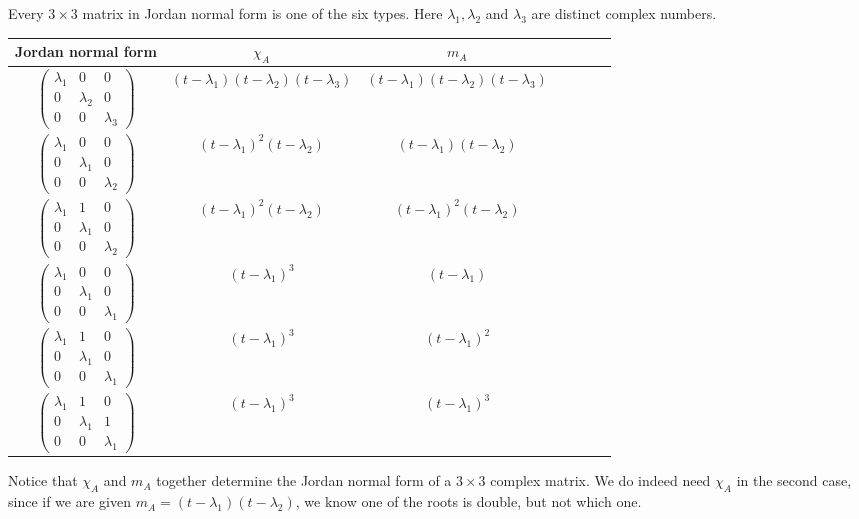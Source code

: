 \documentclass[a4paper]{article}
\begin{document}
\begin{example}
	Every $3\times 3$ matrix in Jordan normal form is one of the six types. Here $\lambda_1, \lambda_2$ and $\lambda_3$ are distinct complex numbers.
  \begin{center}
    \begin{tabular}{ccccccc}
      \toprule
      Jordan normal form & $\chi_A$ & $m_A$\\
      \midrule
      $\begin{pmatrix} \lambda_1 & 0 & 0\\ 0 & \lambda_2 & 0\\ 0 & 0 & \lambda_3 \end{pmatrix}$ & $(t - \lambda_1)(t - \lambda_2)(t- \lambda_3)$ & $(t - \lambda_1)(t - \lambda_2)(t- \lambda_3)$\\\addlinespace
      $\begin{pmatrix} \lambda_1 & 0 & 0\\ 0 & \lambda_1 & 0\\ 0 & 0 & \lambda_2 \end{pmatrix}$ & $(t - \lambda_1)^2 (t - \lambda_2)$ & $(t - \lambda_1) (t - \lambda_2)$\\\addlinespace
      $\begin{pmatrix} \lambda_1 & 1 & 0\\ 0 & \lambda_1 & 0\\ 0 & 0 & \lambda_2 \end{pmatrix}$ & $(t - \lambda_1)^2 (t - \lambda_2)$ & $(t - \lambda_1)^2 (t - \lambda_2)$\\\addlinespace
      $\begin{pmatrix} \lambda_1 & 0 & 0\\ 0 & \lambda_1 & 0\\ 0 & 0 & \lambda_1 \end{pmatrix}$ & $(t - \lambda_1)^3$ & $(t - \lambda_1)$\\\addlinespace
      $\begin{pmatrix} \lambda_1 & 1 & 0\\ 0 & \lambda_1 & 0\\ 0 & 0 & \lambda_1 \end{pmatrix}$ & $(t - \lambda_1)^3$ & $(t - \lambda_1)^2$\\\addlinespace
      $\begin{pmatrix} \lambda_1 & 1 & 0\\ 0 & \lambda_1 & 1\\ 0 & 0 & \lambda_1 \end{pmatrix}$ & $(t - \lambda_1)^3$ & $(t - \lambda_1)^3$\\
      \bottomrule
    \end{tabular}
  \end{center}
  Notice that $\chi_A$ and $m_A$ together determine the Jordan normal form of a $3\times 3$ complex matrix. We do indeed need $\chi_A$ in the second case, since if we are given $m_A = (t - \lambda_1)(t - \lambda_2)$, we know one of the roots is double, but not which one.
\end{example}
\end{document}
